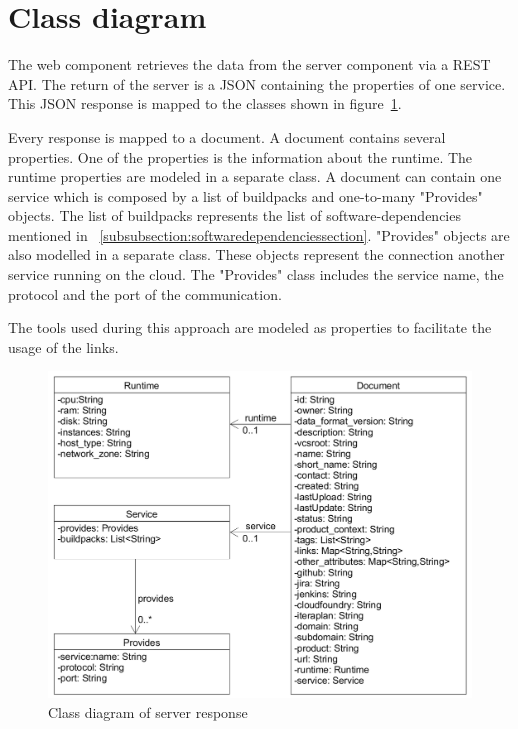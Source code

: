 \section{Class diagram}

The web component retrieves the data from the server component via a REST API. The return of the server is a JSON containing the properties of one service. This JSON response is mapped to the classes shown in figure~\ref{fig:server-response}.

Every response is mapped to a document. A document contains several properties. One of the properties is the information about the runtime. The runtime properties are modeled in a separate class. A document can contain one service which is composed by a list of buildpacks and one-to-many "Provides" objects. The list of buildpacks represents the list of software-dependencies mentioned in ~\ref{subsubsection:softwaredependenciessection}.
"Provides" objects are also modelled in a separate class. These objects represent the connection another service running on the cloud. The "Provides" class includes the service name, the protocol and the port of the communication.

The tools used during this approach are modeled as properties to facilitate the usage of the links. 

\begin{figure}[htpb]
  \centering
  \includegraphics[width=1.0\textwidth]{figures/pivio-classdiagram.PNG}
  \caption{Class diagram of server response}
  \label{fig:server-response}
\end{figure}













